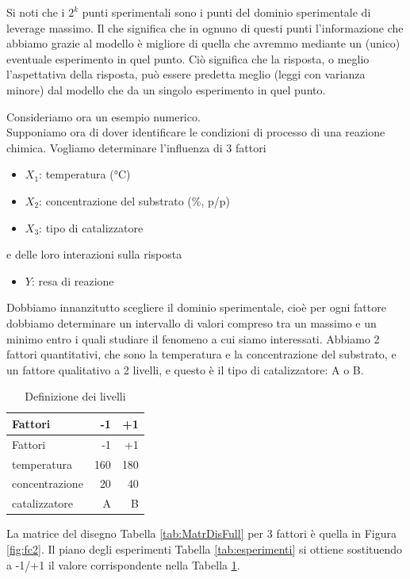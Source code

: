 \documentclass[
  11pt,
]{book}
\providecommand{\tightlist}{%
  \setlength{\itemsep}{0pt}\setlength{\parskip}{0pt}}
\begin{document}
Si noti che i \(2^k\) punti sperimentali sono i punti del dominio
sperimentale di leverage massimo. Il che significa che in ognuno di
questi punti l'informazione che abbiamo grazie al modello è migliore di
quella che avremmo mediante un (unico) eventuale esperimento in quel
punto. Ciò significa che la risposta, o meglio l'aspettativa della
risposta, può essere predetta meglio (leggi con varianza minore) dal
modello che da un singolo esperimento in quel punto. \newline

Consideriamo ora un esempio numerico.\\
Supponiamo ora di dover identificare le condizioni di processo di una
reazione chimica. Vogliamo determinare l'influenza di 3 fattori

\begin{itemize}
\item
  \(X_1\): temperatura (°C)
\item
  \(X_2\): concentrazione del substrato (\%, p/p)
\item
  \(X_3\): tipo di catalizzatore
\end{itemize}

e delle loro interazioni sulla risposta

\begin{itemize}
\tightlist
\item
  \(Y\): resa di reazione
\end{itemize}

Dobbiamo innanzitutto scegliere il dominio sperimentale, cioè per ogni
fattore dobbiamo determinare un intervallo di valori compreso tra un
massimo e un minimo entro i quali studiare il fenomeno a cui siamo
interessati. Abbiamo 2 fattori quantitativi, che sono la temperatura e
la concentrazione del substrato, e un fattore qualitativo a 2 livelli, e
questo è il tipo di catalizzatore: A o B.

\begin{longtable}[]{@{}lrr@{}}
\caption{\label{tab:livelli}Definizione dei livelli}\tabularnewline
\toprule
Fattori & -1 & +1\tabularnewline
\midrule
\endfirsthead
\toprule
Fattori & -1 & +1\tabularnewline
\midrule
\endhead
temperatura & 160 & 180\tabularnewline
concentrazione & 20 & 40\tabularnewline
catalizzatore & A & B\tabularnewline
\bottomrule
\end{longtable}

La matrice del disegno Tabella \ref{tab:MatrDisFull} per 3 fattori è quella in Figura \ref{fig:fc2}. Il piano degli esperimenti Tabella \ref{tab:esperimenti} si
ottiene sostituendo a -1/+1 il valore corrispondente nella Tabella
\ref{tab:livelli}. \newpage
\end{document}
